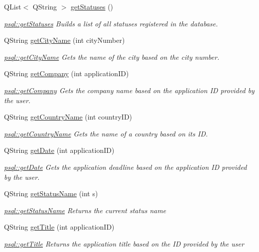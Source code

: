 \begin{DoxyCompactItemize}
Q\+List$<$ Q\+String $>$ \hyperlink{classpsql_a14854d28aabc7e658aea87a7b8b52e5c}{get\+Statuses} ()
\begin{DoxyCompactList}\small\item\em \hyperlink{classpsql_a14854d28aabc7e658aea87a7b8b52e5c}{psql\+::get\+Statuses} Builds a list of all statuses registered in the database. \end{DoxyCompactList}\item 
Q\+String \hyperlink{classpsql_a7acc18034ef60c8a1e69b0e1a15d8ab2}{get\+City\+Name} (int city\+Number)
\begin{DoxyCompactList}\small\item\em \hyperlink{classpsql_a7acc18034ef60c8a1e69b0e1a15d8ab2}{psql\+::get\+City\+Name} Gets the name of the city based on the city number. \end{DoxyCompactList}\item 
Q\+String \hyperlink{classpsql_a09745cd03f09ffb2dacacaab4281915f}{get\+Company} (int application\+ID)
\begin{DoxyCompactList}\small\item\em \hyperlink{classpsql_a09745cd03f09ffb2dacacaab4281915f}{psql\+::get\+Company} Gets the company name based on the application ID provided by the user. \end{DoxyCompactList}\item 
Q\+String \hyperlink{classpsql_a5724e9992e6a5c98524ab73b98f4202d}{get\+Country\+Name} (int country\+ID)
\begin{DoxyCompactList}\small\item\em \hyperlink{classpsql_a5724e9992e6a5c98524ab73b98f4202d}{psql\+::get\+Country\+Name} Gets the name of a country based on its ID. \end{DoxyCompactList}\item 
Q\+String \hyperlink{classpsql_a561f96bfe7e9d092077712dd6b186af8}{get\+Date} (int application\+ID)
\begin{DoxyCompactList}\small\item\em \hyperlink{classpsql_a561f96bfe7e9d092077712dd6b186af8}{psql\+::get\+Date} Gets the application deadline based on the application ID provided by the user. \end{DoxyCompactList}\item 
Q\+String \hyperlink{classpsql_a5c2a64419a68a258071fd1f9a37c7c09}{get\+Status\+Name} (int s)
\begin{DoxyCompactList}\small\item\em \hyperlink{classpsql_a5c2a64419a68a258071fd1f9a37c7c09}{psql\+::get\+Status\+Name} Returns the current status name \end{DoxyCompactList}\item 
Q\+String \hyperlink{classpsql_ada9e3be3e0866011edf53e30ec510afc}{get\+Title} (int application\+ID)
\begin{DoxyCompactList}\small\item\em \hyperlink{classpsql_ada9e3be3e0866011edf53e30ec510afc}{psql\+::get\+Title} Returns the application title based on the ID provided by the user \end{DoxyCompactList}\end{DoxyCompactItemize}


